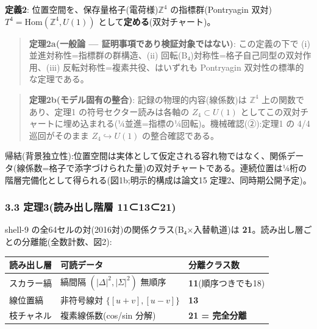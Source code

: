 \documentclass[
]{ltjsarticle}
\newcounter{none} %
\begin{document}
\textbf{定義2}: 位置空間を、保存量格子(電荷様)\(\mathbb{Z}^4\)
の指標群(Pontryagin 双対)\(T^4=\mathrm{Hom}(\mathbb{Z}^4,U(1))\)
として\textbf{定める}(双対チャート)。

\begin{quote}
\textbf{定理2a(一般論 --- 証明事項であり検証対象ではない)}:
この定義の下で (i) 並進対称性=指標群の群構造、(ii)
回転(B₄)対称性=格子自己同型の双対作用、(iii)
反転対称性=複素共役、はいずれも Pontryagin 双対性の標準的な定理である。
\end{quote}

\begin{quote}
\textbf{定理2b(モデル固有の整合)}: 記録の物理的内容(線係数)は
\(\mathbb{Z}^4\) 上の関数であり、定理1 の符号セクター読みは各軸の
\(Z_4\subset U(1)\)
としてこの双対チャートに埋め込まれる(¼並進=指標の¼回転)。機械確認(②):定理1
の 4/4 巡回がそのまま \(Z_4\hookrightarrow U(1)\) の整合確認である。
\end{quote}

帰結(背景独立性):位置空間は実体として仮定される容れ物ではなく、関係データ(線係数=格子で添字づけられた量)の双対チャートである。連続位置は¼桁の階層完備化として得られる(図1b;明示的構成は論文15
定理2、同時期公開予定)。

\subsubsection{3.3 定理3(読み出し階層
11⊂13⊂21)}\label{ux5b9aux74063ux8aadux307fux51faux3057ux968eux5c64-111321}

shell-9 の全64セルの対(2016対)の関係クラス(B₄×入替軌道)は
\textbf{21}。読み出し層ごとの分離能(全数計数、図2):

{\def\LTcaptype{none} %
\begin{longtable}[]{@{}
  >{\raggedright\arraybackslash}p{}
  >{\raggedright\arraybackslash}p{}
  >{\raggedright\arraybackslash}p{}@{}}
\toprule\noalign{}
\begin{minipage}[b]{\linewidth}\raggedright
読み出し層
\end{minipage} & \begin{minipage}[b]{\linewidth}\raggedright
可読データ
\end{minipage} & \begin{minipage}[b]{\linewidth}\raggedright
分離クラス数
\end{minipage} \\
\midrule\noalign{}
\endhead
\bottomrule\noalign{}
\endlastfoot
スカラー縞 & 縞間隔 \((|\Delta|^2,|\Sigma|^2)\) 無順序 &
\textbf{11}(順序つきでも18) \\
線位置縞 & 非符号線対 \(\{[u{+}v],[u{-}v]\}\) & \textbf{13} \\
枝チャネル & 複素線係数(cos/sin 分解) & \textbf{21 = 完全分離} \\
\end{longtable}
}
\end{document}
